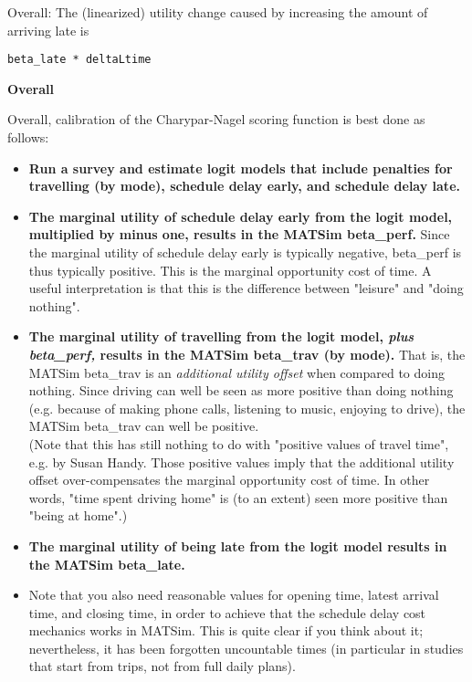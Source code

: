 Overall: The (linearized) utility change caused by increasing the amount of arriving late is
\begin{verbatim}
beta_late * deltaLtime

\end{verbatim}

\textbf{Overall}

Overall, calibration of the Charypar-Nagel scoring function is best done as follows:
\begin{itemize}
	\item \textbf{Run a survey and estimate logit models that include  penalties for travelling (by mode), schedule delay early, and schedule  delay late.}
	\item \textbf{The marginal utility of schedule delay early from the logit  model, multiplied by minus one, results in the MATSim beta\_perf.}  Since the marginal utility of schedule delay early is typically  negative, beta\_perf is thus typically positive. This is the  marginal opportunity cost of time. A useful interpretation is that  this is the difference between "leisure" and "doing nothing".
	\item \textbf{The marginal utility of travelling from the logit model, \emph{plus beta\_perf,} results in the MATSim beta\_trav (by mode).} That is, the MATSim beta\_trav is an \emph{additional utility offset}  when compared to doing nothing. Since driving can well be seen as  more positive than doing nothing (e.g. because of making phone calls,  listening to music, enjoying to drive), the MATSim beta\_trav can well be  positive.
\\   (Note that this has still nothing to do with "positive values of  travel time", e.g. by Susan Handy. Those positive values imply  that the additional utility offset over-compensates the marginal  opportunity cost of time. In other words, "time spent driving  home" is (to an extent) seen more positive than "being at home".)
	\item \textbf{The marginal utility of being late from the logit model results in the MATSim beta\_late.}
	\item Note that you also need reasonable values for opening time, latest  arrival time, and closing time, in order to achieve that the schedule  delay cost mechanics works in MATSim. This is quite clear if you  think about it; nevertheless, it has been forgotten uncountable times  (in particular in studies that start from trips, not from full daily  plans).
\end{itemize}

